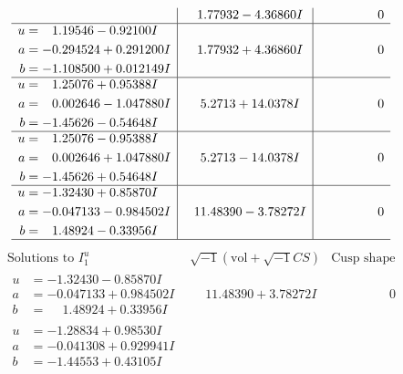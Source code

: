 \documentclass[1p]{elsarticle_modified}
\theoremstyle{definition}
\newcommand{\I}{\sqrt{-1}}
\begin{document}
$$\begin{array}{c|c|c}
 & \phantom{-}1.77932 - 4.36860 I & \phantom{-0.000000 } 0 \\ \hline\begin{aligned}
u &= \phantom{-}1.19546 - 0.92100 I \\
a &= -0.294524 + 0.291200 I \\
b &= -1.108500 + 0.012149 I\end{aligned}
 & \phantom{-}1.77932 + 4.36860 I & \phantom{-0.000000 } 0 \\ \hline\begin{aligned}
u &= \phantom{-}1.25076 + 0.95388 I \\
a &= \phantom{-}0.002646 - 1.047880 I \\
b &= -1.45626 - 0.54648 I\end{aligned}
 & \phantom{-}5.2713 + 14.0378 I & \phantom{-0.000000 } 0 \\ \hline\begin{aligned}
u &= \phantom{-}1.25076 - 0.95388 I \\
a &= \phantom{-}0.002646 + 1.047880 I \\
b &= -1.45626 + 0.54648 I\end{aligned}
 & \phantom{-}5.2713 - 14.0378 I & \phantom{-0.000000 } 0 \\ \hline\begin{aligned}
u &= -1.32430 + 0.85870 I \\
a &= -0.047133 - 0.984502 I \\
b &= \phantom{-}1.48924 - 0.33956 I\end{aligned}
 & \phantom{-}11.48390 - 3.78272 I & \phantom{-0.000000 } 0\\
 \hline 
 \end{array}$$\newpage$$\begin{array}{c|c|c}  
\text{Solutions to }I^u_{1}& \I (\text{vol} + \sqrt{-1}CS) & \text{Cusp shape}\\
 \hline 
\begin{aligned}
u &= -1.32430 - 0.85870 I \\
a &= -0.047133 + 0.984502 I \\
b &= \phantom{-}1.48924 + 0.33956 I\end{aligned}
 & \phantom{-}11.48390 + 3.78272 I & \phantom{-0.000000 } 0 \\ \hline\begin{aligned}
u &= -1.28834 + 0.98530 I \\
a &= -0.041308 + 0.929941 I \\
b &= -1.44553 + 0.43105 I\end{aligned}

\end{array}$$
\end{document}
